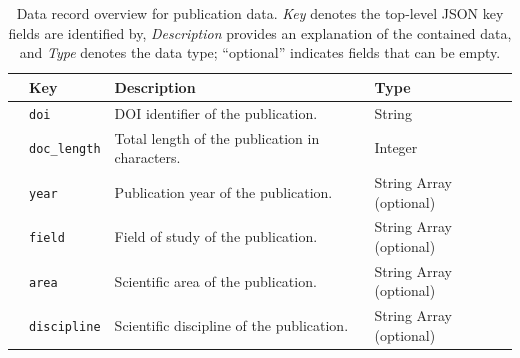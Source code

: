 \begin{table}[ht]
\centering
\small

\caption{Data record overview for publication data. \textit{Key} denotes the top-level JSON key fields are identified by, \textit{Description} provides an explanation of the contained data, and \textit{Type} denotes the data type; ``optional'' indicates fields that can be empty.}
\label{tab:data-record-publications}

\begin{tabularx}{\textwidth}{@{}clXl@{}}
\toprule
& \textbf{\textsf{Key}} & \textbf{\textsf{Description}} & \textbf{\textsf{Type}} \\

\midrule

\parbox[t]{0.7em}{}
& \texttt{doi}         & DOI identifier of the publication.             & String\\
& \texttt{doc\_length} & Total length of the publication in characters. & Integer\\
& \texttt{year}        & Publication year of the publication.           & String Array (optional)\\
& \texttt{field}       & Field of study of the publication.             & String Array (optional)\\
& \texttt{area}        & Scientific area of the publication.            & String Array (optional)\\
& \texttt{discipline}  & Scientific discipline of the publication.      & String Array (optional)\\

\bottomrule
\end{tabularx}

\end{table}
